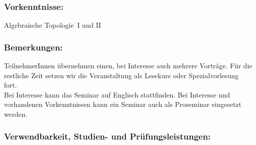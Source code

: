 \documentclass[a4paper,10pt]{article}
\begin{document}
\subsubsection*{\large
    Vorkenntnisse:
}
Algebraische Topologie~I und II
\subsubsection*{\large
    Bemerkungen:
}
TeilnehmerInnen übernehmen einen, bei Interesse auch mehrere Vorträge.
Für die restliche Zeit setzen wir die Veranstaltung als Lesekurs oder Spezialvorlesung fort. \\
Bei Interesse kann das Seminar auf Englisch stattfinden.
Bei Interesse und vorhandenen Vorkenntnissen kann ein Seminar auch als Proseminar eingesetzt werden.
\subsubsection*{\large
    Verwendbarkeit, Studien- und Prüfungsleistungen:
}
\end{document}
